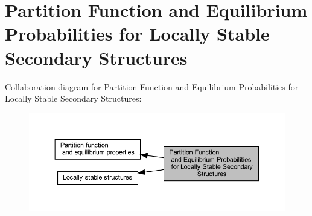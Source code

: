 \hypertarget{group__local__pf__fold}{}\section{Partition Function and Equilibrium Probabilities for Locally Stable Secondary Structures}
\label{group__local__pf__fold}
Collaboration diagram for Partition Function and Equilibrium Probabilities for Locally Stable Secondary Structures\+:
\nopagebreak
\begin{figure}[H]
\begin{center}
\leavevmode
\includegraphics[width=350pt]{group__local__pf__fold}
\end{center}
\end{figure}
